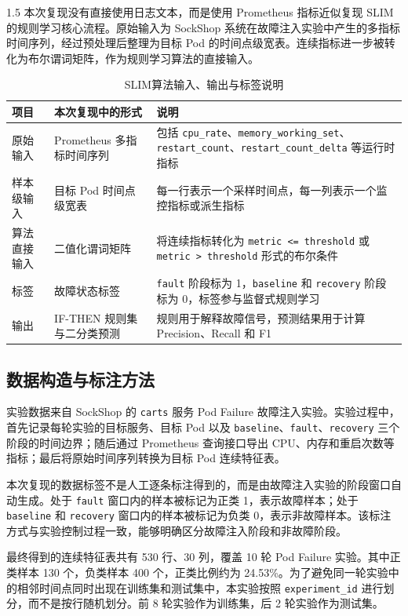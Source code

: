 \documentclass[a4paper,12pt]{report}
\begin{document}
\begin{spacing}{1.5}
本次复现没有直接使用日志文本，而是使用 Prometheus 指标近似复现 SLIM 的规则学习核心流程。原始输入为 SockShop 系统在故障注入实验中产生的多指标时间序列，经过预处理后整理为目标 Pod 的时间点级宽表。连续指标进一步被转化为布尔谓词矩阵，作为规则学习算法的直接输入。

\begin{table}[H]
\centering
\caption{SLIM算法输入、输出与标签说明}
\begin{tabular}{p{3cm}p{4.2cm}p{6.2cm}}
\toprule
\textbf{项目} & \textbf{本次复现中的形式} & \textbf{说明} \\
\midrule
原始输入 & Prometheus 多指标时间序列 & 包括 \texttt{cpu\_rate}、\texttt{memory\_working\_set}、\texttt{restart\_count}、\texttt{restart\_count\_delta} 等运行时指标 \\
样本级输入 & 目标 Pod 时间点级宽表 & 每一行表示一个采样时间点，每一列表示一个监控指标或派生指标 \\
算法直接输入 & 二值化谓词矩阵 & 将连续指标转化为 \texttt{metric <= threshold} 或 \texttt{metric > threshold} 形式的布尔条件 \\
标签 & 故障状态标签 & \texttt{fault} 阶段标为 1，\texttt{baseline} 和 \texttt{recovery} 阶段标为 0，标签参与监督式规则学习 \\
输出 & IF-THEN 规则集与二分类预测 & 规则用于解释故障信号，预测结果用于计算 Precision、Recall 和 F1 \\
\bottomrule
\end{tabular}
\end{table}

\subsection{数据构造与标注方法}

实验数据来自 SockShop 的 \texttt{carts} 服务 Pod Failure 故障注入实验。实验过程中，首先记录每轮实验的目标服务、目标 Pod 以及 \texttt{baseline}、\texttt{fault}、\texttt{recovery} 三个阶段的时间边界；随后通过 Prometheus 查询接口导出 CPU、内存和重启次数等指标；最后将原始时间序列转换为目标 Pod 连续特征表。

本次复现的数据标签不是人工逐条标注得到的，而是由故障注入实验的阶段窗口自动生成。处于 \texttt{fault} 窗口内的样本被标记为正类 1，表示故障样本；处于 \texttt{baseline} 和 \texttt{recovery} 窗口内的样本被标记为负类 0，表示非故障样本。该标注方式与实验控制过程一致，能够明确区分故障注入阶段和非故障阶段。

最终得到的连续特征表共有 530 行、30 列，覆盖 10 轮 Pod Failure 实验。其中正类样本 130 个，负类样本 400 个，正类比例约为 24.53\%。为了避免同一轮实验中的相邻时间点同时出现在训练集和测试集中，本实验按照 \texttt{experiment\_id} 进行划分，而不是按行随机划分。前 8 轮实验作为训练集，后 2 轮实验作为测试集。


\end{spacing}
\end{document}
